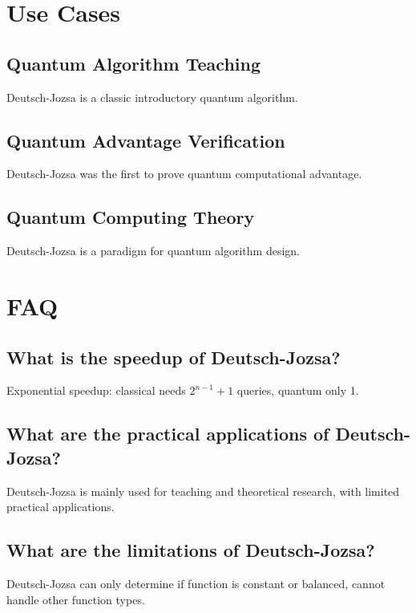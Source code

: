 \documentclass[12pt,a4paper]{article}
\begin{document}
\section{Use Cases}

\subsection{Quantum Algorithm Teaching}

Deutsch-Jozsa is a classic introductory quantum algorithm.

\subsection{Quantum Advantage Verification}

Deutsch-Jozsa was the first to prove quantum computational advantage.

\subsection{Quantum Computing Theory}

Deutsch-Jozsa is a paradigm for quantum algorithm design.

\section{FAQ}

\subsection{What is the speedup of Deutsch-Jozsa?}

Exponential speedup: classical needs $2^{n-1}+1$ queries, quantum only 1.

\subsection{What are the practical applications of Deutsch-Jozsa?}

Deutsch-Jozsa is mainly used for teaching and theoretical research, with limited practical applications.

\subsection{What are the limitations of Deutsch-Jozsa?}

Deutsch-Jozsa can only determine if function is constant or balanced, cannot handle other function types.
\end{document}

